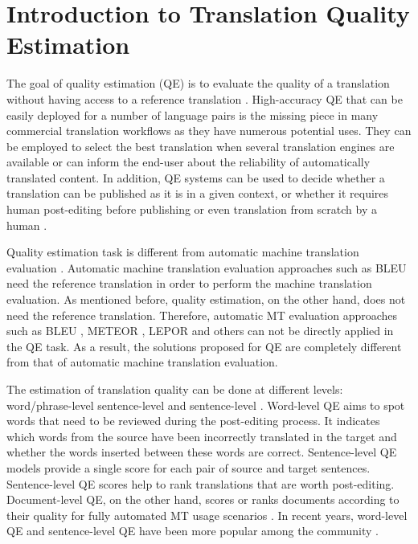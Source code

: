 
\DeclareRobustCommand{\hlgreen}[1]{{\sethlcolor{asparagus}\hl{#1}}}

\DeclareRobustCommand{\hlred}[1]{{\sethlcolor{brickred}\hl{#1}}}

\newcommand{\hlc}[2][yellow]{{%
		\colorlet{foo}{#1}%
		\sethlcolor{foo}\hl{#2}}%
}


\chapter{\label{cha:qe_introduction}Introduction to Translation Quality Estimation}

The goal of quality estimation (QE) is to evaluate the quality of a translation without having access to a reference translation \autocite{specia-etal-2018-findings}. High-accuracy QE that can be easily deployed for a number of language pairs is the missing piece in many commercial translation workflows as they have numerous potential uses. They can be employed to select the best translation when several translation engines are available or can inform the end-user about the reliability of automatically translated content. In addition, QE systems can be used to decide whether a translation can be published as it is in a given context, or whether it requires human post-editing before publishing or even translation from scratch by a human  \autocite{kepler-etal-2019-openkiwi}. 

Quality estimation task is different from automatic machine translation evaluation \autocite{barrault-etal-2020-findings}. Automatic machine translation evaluation approaches such as BLEU \autocite{papineni-etal-2002-bleu} need the reference translation in order to perform the machine translation evaluation. As mentioned before, quality estimation, on the other hand, does not need the reference translation. Therefore, automatic MT evaluation approaches such as BLEU \autocite{papineni-etal-2002-bleu}, METEOR \autocite{banerjee-lavie-2005-meteor}, LEPOR \autocite{han-etal-2012-lepor} and others can not be directly applied in the QE task. As a result, the solutions proposed for QE are completely different from that of automatic machine translation evaluation.

The estimation of translation quality can be done at different levels: word/phrase-level sentence-level and sentence-level \autocite{ive-etal-2018-deepquest}. Word-level QE aims to spot words that need to be reviewed during the post-editing process. It indicates which words from the source have been incorrectly translated in the target and whether the words inserted between these words are correct. Sentence-level QE models provide a single score for each pair of source and target sentences. Sentence-level QE scores help to rank translations that are worth post-editing. Document-level QE, on the other hand, scores or ranks documents according to their quality for fully automated MT usage scenarios \autocite{ive-etal-2018-deepquest}. In recent years, word-level QE and sentence-level QE have been more popular among the community \autocite{specia-etal-2018-findings}.

